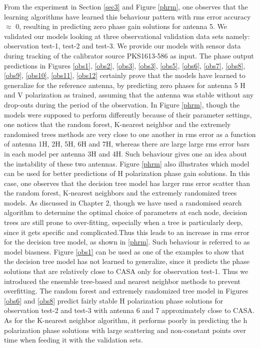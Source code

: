 From the experiment in Section \ref{sec3} and Figure \ref{phrm}, one observes that the learning algorithms have learned this behaviour pattern with rms error accuracy $\approx$ 0, resulting in predicting zero phase gain solutions for antenna 5. We validated our models looking at three observational validation data sets namely: observation test-1, test-2 and test-3. We provide our models with sensor data during tracking of the calibrator source PKS1613-586 as input. The phase output predictions in Figures \ref{obs1}, \ref{obs2}, \ref{obs3}, \ref{obs3}, \ref{obs5}, \ref{obs6}, \ref{obs7}, \ref{obs8}, \ref{obs9}, \ref{obs10}, \ref{obs11}, \ref{obs12}  certainly prove that the models have learned to generalize for the reference antenna, by predicting zero phases for antenna 5 H and V polarization as trained, assuming that the antenna was stable without any drop-outs during the period of the observation. In Figure \ref{phrm}, though the models were supposed to perform differently because of their parameter settings, one notices that the random forest, K-nearest neighbor and the extremely randomised trees methods are very close to one another in rms error as a function of antenna 1H, 2H, 5H, 6H and 7H, whereas there are large large rms error bars in each model per antenna 3H and 4H. Such behaviour gives one an idea about the instability of these two antennas. Figure \ref{phrm} also illustrates which model can be used for better predictions of H polarization phase gain solutions. In this case, one observes that the decision tree model has larger rms error scatter than the random forest, K-nearest neighbors and the extremely randomized trees models. As discussed in Chapter 2, though we have used a randomised search algorithm to determine the optimal choice of parameters at each node, decision trees are still prone to over-fitting, especially when a tree is particularly deep, since it gets specific and complicated.Thus this leads to an increase in rms error for the decision tree model, as shown in \ref{phrm}. Such behaviour is referred to as model biasness. Figure \ref{obs1} can be used as one of the examples to show that the decision tree model has not learned to generalize, since it predicts the phase solutions that are relatively close to CASA only for observation test-1. Thus we introduced the ensemble tree-based and nearest neighbor methods to prevent overfitting. The random forest and extremely randomized tree model in Figures \ref{obs6} and \ref{obs8} predict fairly stable H polarization phase solutions for observation test-2 and test-3 with antenna 6 and 7 approximately close to CASA. As for the K-nearest neighbor algorithm, it performs poorly in predicting the h polarization phase solutions with large scattering and non-constant points over time when feeding it with the validation sets. 
  
